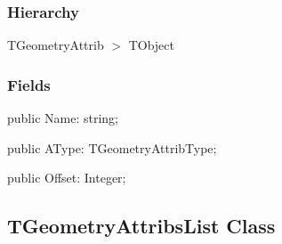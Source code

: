 \documentclass{report}
\newif\ifpdf
\begin{document}
\subsubsection*{\large{\textbf{Hierarchy}}\normalsize\hspace{1ex}\hfill}
TGeometryAttrib {$>$} TObject
\subsubsection*{\large{\textbf{Fields}}\normalsize\hspace{1ex}\hfill}
\begin{list}{}{
\setlength{\itemindent}{0cm}
\setlength{\listparindent}{0cm}
\setlength{\leftmargin}{\evensidemargin}
\addtolength{\leftmargin}{\tmplength}
\settowidth{\labelsep}{X}
\addtolength{\leftmargin}{\labelsep}
\setlength{\labelwidth}{\tmplength}
}
\label{ok_generic.TGeometryAttrib-Name}
\item[\textbf{Name}\hfill]
\ifpdf
\begin{flushleft}
\fi
\begin{ttfamily}
public Name: string;\end{ttfamily}

\ifpdf
\end{flushleft}
\fi


\par  \label{ok_generic.TGeometryAttrib-AType}
\item[\textbf{AType}\hfill]
\ifpdf
\begin{flushleft}
\fi
\begin{ttfamily}
public AType: TGeometryAttribType;\end{ttfamily}

\ifpdf
\end{flushleft}
\fi


\par  \label{ok_generic.TGeometryAttrib-Offset}
\item[\textbf{Offset}\hfill]
\ifpdf
\begin{flushleft}
\fi
\begin{ttfamily}
public Offset: Integer;\end{ttfamily}

\ifpdf
\end{flushleft}
\fi


\par  \end{list}
\ifpdf
\subsection*{\large{\textbf{TGeometryAttribsList Class}}\normalsize\hspace{1ex}\hrulefill}
\else
\end{document}
